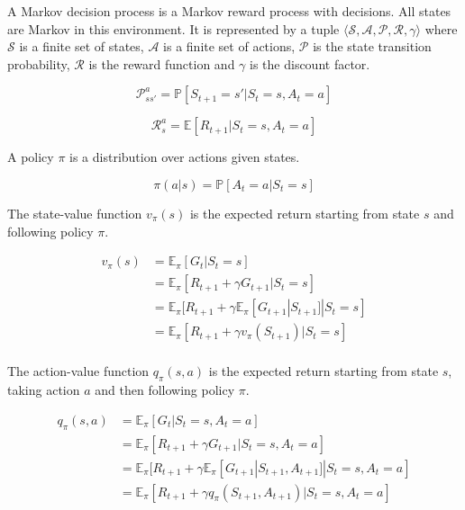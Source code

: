 A Markov decision process is a Markov reward process with decisions. All states
are Markov in this environment. It is represented by a tuple
$\langle\mathcal{S}, \mathcal{A}, \mathcal{P}, \mathcal{R}, \gamma\rangle$
where $\mathcal{S}$ is a finite set of states, $\mathcal{A}$ is a finite set of
actions, $\mathcal{P}$ is the state transition probability, $\mathcal{R}$ is
the reward function and $\gamma$ is the discount factor.

\[
    \mathcal{P}_{ss'}^a = \mathbb{P}[S_{t+1} = s' | S_t = s, A_t = a]
\]

\[
    \mathcal{R}_s^a = \mathbb{E}[R_{t+1} | S_t = s, A_t = a]
\]

\noindent A policy $\pi$ is a distribution over actions given states.

\[
    \pi(a|s) = \mathbb{P}[A_t = a | S_t = s]
\]

\noindent The state-value function $v_{\pi}(s)$ is the expected return starting from state
$s$ and following policy $\pi$.

\begin{align*}
    v_{\pi}(s) & = \mathbb{E}_{\pi}[G_t | S_t = s]                                                  \\
               & = \mathbb{E}_{\pi}[R_{t+1} + \gamma G_{t+1} | S_t = s]                             \\
               & = \mathbb{E}_{\pi}[R_{t+1} + \gamma \mathbb{E}_{\pi}[G_{t+1} | S_{t+1}] | S_t = s] \\
               & = \mathbb{E}_{\pi}[R_{t+1} + \gamma v_{\pi}(S_{t+1}) | S_t = s]                    \\
\end{align*}

\noindent The action-value function $q_{\pi}(s, a)$ is the expected return starting from state
$s$, taking action $a$ and then following policy $\pi$.

\begin{align*}
    q_{\pi}(s, a) & = \mathbb{E}_{\pi}[G_t | S_t = s, A_t = a]                                                          \\
                  & = \mathbb{E}_{\pi}[R_{t+1} + \gamma G_{t+1} | S_t = s, A_t = a]                                     \\
                  & = \mathbb{E}_{\pi}[R_{t+1} + \gamma \mathbb{E}_\pi [G_{t+1} | S_{t+1}, A_{t+1}] | S_t = s, A_t = a] \\
                  & = \mathbb{E}_{\pi}[R_{t+1} + \gamma q_{\pi}(S_{t+1}, A_{t+1}) | S_t = s, A_t = a]                   \\
\end{align*}

